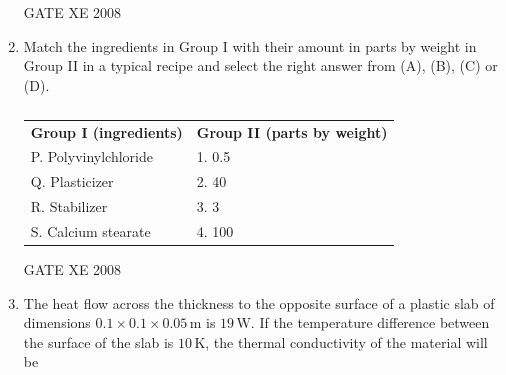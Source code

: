 \documentclass[12pt]{article}
\begin{document}
\begin{enumerate}[label=Q\arabic*.]
GATE XE 2008

\item Match the ingredients in Group I with their amount in parts by weight in Group II in a typical recipe and select the right answer from (A), (B), (C) or (D).

\begin{table}[H]     \centering     \caption{}     \label{}     \begin{tabular}{l l}
\textbf{Group I (ingredients)} & \textbf{Group II (parts by weight)} \\
P. Polyvinylchloride & 1. 0.5 \\
Q. Plasticizer & 2. 40 \\
R. Stabilizer & 3. 3 \\
S. Calcium stearate & 4. 100 \\
\end{tabular} \end{table}

\begin{enumerate}[label=(\Alph*)]
\end{enumerate}

GATE XE 2008

\item The heat flow across the thickness to the opposite surface of a plastic slab of dimensions $0.1 \times 0.1 \times 0.05 \, \text{m}$ is $19 \, \text{W}$. If the temperature difference between the surface of the slab is $10 \, \text{K}$, the thermal conductivity of the material will be

\begin{enumerate}[label=(\Alph*)]
\end{enumerate}


\end{enumerate}
\end{document}
